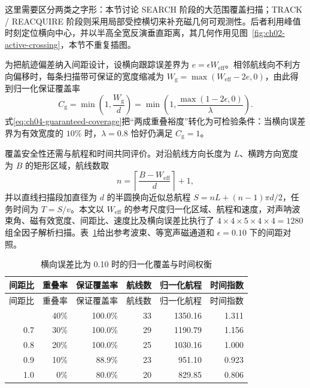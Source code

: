 这里需要区分两类之字形：本节讨论 SEARCH 阶段的大范围覆盖扫描；TRACK / REACQUIRE 阶段则采用局部受控横切来补充磁几何可观测性。后者利用峰值时刻定位横向中心，并以半高全宽反演垂直距离，其几何作用见图~\ref{fig:ch02-active-crossing}，本节不重复插图。

为把航迹偏差纳入间距设计，设横向跟踪误差界为 \(e=\epsilon W_{\mathrm{eff}}\)。相邻航线向不利方向偏移时，每条扫描带可保证的宽度缩减为 \(W_{\mathrm{g}}=\max(W_{\mathrm{eff}}-2e,0)\)，由此得到归一化保证覆盖率
\begin{equation}
C_{\mathrm{g}}
=\min\left(1,\frac{W_{\mathrm{g}}}{d}\right)
=\min\left(1,\frac{\max(1-2\epsilon,0)}{\lambda}\right).
\label{eq:ch04-guaranteed-coverage}
\end{equation}
式\eqref{eq:ch04-guaranteed-coverage}把``两成重叠裕度''转化为可检验条件：当横向误差界为有效宽度的 \(10\%\) 时，\(\lambda=0.8\) 恰好仍满足 \(C_{\mathrm{g}}=1\)。

覆盖安全性还需与航程和时间共同评价。对沿航线方向长度为 \(L\)、横跨方向宽度为 \(B\) 的矩形区域，航线数取
\begin{equation}
n=\left\lceil\frac{B-W_{\mathrm{eff}}}{d}\right\rceil+1 ,
\label{eq:ch04-line-count}
\end{equation}
并以直线扫描段加直径为 \(d\) 的半圆换向近似总航程 \(S=nL+(n-1)\pi d/2\)，任务时间为 \(T=S/v\)。本文以 \(W_{\mathrm{eff}}\) 的参考尺度归一化区域、航程和速度，对声呐波束角、磁有效宽度、间距比、速度比及横向误差比执行了 \(4\times4\times5\times4\times4=1280\) 组全因子解析扫描。表~\ref{tab:ch04-normalized-coverage}给出参考波束、等宽声磁通道和 \(\epsilon=0.10\) 下的间距对照。

\begin{longtable}[]{@{}rrrrrr@{}}
\caption{横向误差比为 0.10 时的归一化覆盖与时间权衡}\label{tab:ch04-normalized-coverage}\tabularnewline
\toprule\noalign{}
间距比 & 重叠率 & 保证覆盖率 & 航线数 & 归一化航程 & 时间指数 \\
\midrule\noalign{}
\endfirsthead
\toprule\noalign{}
间距比 & 重叠率 & 保证覆盖率 & 航线数 & 归一化航程 & 时间指数 \\
\midrule\noalign{}
\endhead
\bottomrule\noalign{}
\endlastfoot
0.6 & 40\% & 100.0\% & 33 & 1350.16 & 1.311 \\
0.7 & 30\% & 100.0\% & 29 & 1190.79 & 1.156 \\
0.8 & 20\% & 100.0\% & 25 & 1030.16 & 1.000 \\
0.9 & 10\% & 88.9\% & 23 & 951.10 & 0.923 \\
1.0 & 0\% & 80.0\% & 20 & 829.85 & 0.806 \\
\end{longtable}

